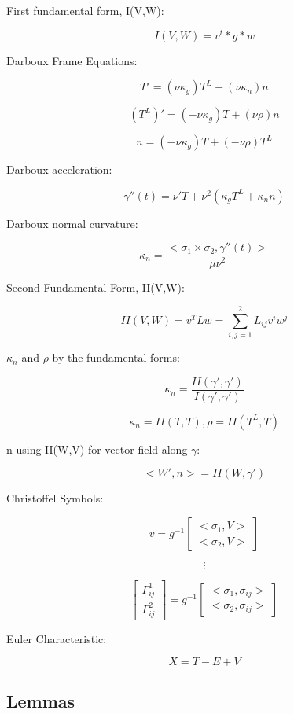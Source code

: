 \documentclass{article}
\begin{document}
First fundamental form, I(V,W):

\[I(V,W) = v^t*g*w\]

Darboux Frame Equations:

\[ T' = (\nu \kappa_{g})T^L + (\nu \kappa_{n})n\]

\[(T^L)' = (- \nu  \kappa_{g})T + (\nu \rho)n\]

\[n =  (- \nu  \kappa_{g})T + (-\nu \rho)T^L\]

Darboux acceleration:

\[ \gamma''(t) = \nu'T + \nu^2 (\kappa_{g} T^L + \kappa_{n} n) \]

Darboux normal curvature:

\[ \kappa_{n} = \frac{<\sigma_1 \times \sigma_2, \gamma''(t)>}{\mu \nu^2} \]

Second Fundamental Form, II(V,W):

\[ II(V,W) = v^T L w = \sum_{i,j=1}^{2} L_{ij}v^i w^j\]

$\kappa_{n}$ and $\rho$ by the fundamental forms:

\[ \kappa_{n} = \frac{II(\gamma',\gamma')}{I(\gamma',\gamma')} \]

\[ \kappa_{n} = II(T, T), \rho = II(T^L, T)\]

n using II(W,V) for vector field along $\gamma$:

\[ <W', n> = II(W, \gamma') \]

Christoffel Symbols:

\[ v = g^{-1} 
 \begin{bmatrix}
<\sigma_{1}, V>\\
<\sigma_{2}, V>
\end{bmatrix}
\]

\[ \vdots \]

\[ 
\begin{bmatrix}
\Gamma_{ij}^{1}\\
\Gamma_{ij}^{2}
\end{bmatrix}
= g^{-1} 
 \begin{bmatrix}
<\sigma_{1}, \sigma_{ij}>\\
<\sigma_{2}, \sigma_{ij}>
\end{bmatrix}
\]

Euler Characteristic:

\[ X = T - E + V  \]

 \subsection{Lemmas}
 
\end{document}

